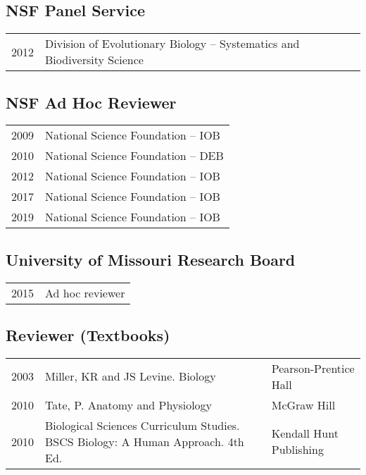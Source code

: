 \documentclass[11pt, a4paper]{awesome-cv}
\begin{document}
\hypertarget{nsf-panel-service}{%
\subsection{NSF Panel Service}\label{nsf-panel-service}}

\begin{tabular}{ll}
  2012 & Division of Evolutionary Biology -- Systematics and Biodiversity Science \\ 
  \end{tabular}

\hypertarget{nsf-ad-hoc-reviewer}{%
\subsection{NSF Ad Hoc Reviewer}\label{nsf-ad-hoc-reviewer}}

\begin{tabular}{ll}
  2009 & National Science Foundation -- IOB \\ 
  2010 & National Science Foundation -- DEB \\ 
  2012 & National Science Foundation -- IOB \\ 
  2017 & National Science Foundation -- IOB \\ 
  2019 & National Science Foundation -- IOB \\ 
  \end{tabular}

\hypertarget{university-of-missouri-research-board}{%
\subsection{University of Missouri Research
Board}\label{university-of-missouri-research-board}}

\begin{tabular}{ll}
  2015 & Ad hoc reviewer \\ 
  \end{tabular}

\hypertarget{reviewer-textbooks}{%
\subsection{Reviewer (Textbooks)}\label{reviewer-textbooks}}

\begin{tabular}{lll}
  2003 & Miller, KR and JS Levine. Biology & Pearson-Prentice Hall \\ 
  2010 & Tate, P. Anatomy and Physiology & McGraw Hill \\ 
  2010 & Biological Sciences Curriculum Studies. BSCS Biology: A Human Approach. 4th Ed. & Kendall Hunt Publishing \\ 
  \end{tabular}
\end{document}
